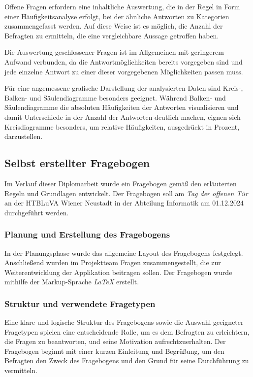 Offene Fragen erfordern eine inhaltliche Auswertung, die in der Regel in Form einer Häufigkeitsanalyse erfolgt, bei der
ähnliche Antworten zu Kategorien zusammengefasst werden. Auf diese Weise ist es möglich, die Anzahl der Befragten zu
ermitteln, die eine vergleichbare Aussage getroffen haben.

Die Auswertung geschlossener Fragen ist im Allgemeinen mit geringerem Aufwand verbunden, da die Antwortmöglichkeiten
bereits vorgegeben sind und jede einzelne Antwort zu einer dieser vorgegebenen Möglichkeiten passen muss.

Für eine angemessene grafische Darstellung der analysierten Daten sind Kreis-, Balken- und Säulendiagramme besonders
geeignet. Während Balken- und Säulendiagramme die absoluten Häufigkeiten der Antworten visualisieren und damit Unterschiede
in der Anzahl der Antworten deutlich machen, eignen sich Kreisdiagramme besonders, um relative Häufigkeiten, ausgedrückt
in Prozent, darzustellen.

\subsection{Selbst erstellter Fragebogen}
Im Verlauf dieser Diplomarbeit wurde ein Fragebogen gemäß den erläuterten Regeln und Grundlagen entwickelt. Der Fragebogen
soll am \textit{Tag der offenen Tür} an der HTBLuVA Wiener Neustadt in der Abteilung Informatik am 01.12.2024 durchgeführt
werden.

\subsubsection{Planung und Erstellung des Fragebogens}
In der Planungsphase wurde das allgemeine Layout des Fragebogens festgelegt. Anschließend wurden im Projektteam
Fragen zusammengestellt, die zur Weiterentwicklung der Applikation beitragen sollen. Der Fragebogen wurde mithilfe der
Markup-Sprache \textit{LaTeX} erstellt.

\subsubsection{Struktur und verwendete Fragetypen}
Eine klare und logische Struktur des Fragebogens sowie die Auswahl geeigneter Fragetypen spielen eine entscheidende Rolle,
um es dem Befragten zu erleichtern, die Fragen zu beantworten, und seine Motivation aufrechtzuerhalten. Der Fragebogen
beginnt mit einer kurzen Einleitung und Begrüßung, um den Befragten den Zweck des Fragebogens und den Grund für seine
Durchführung zu vermitteln.

